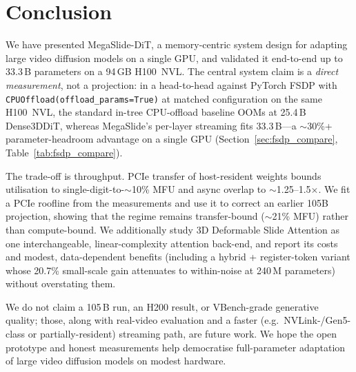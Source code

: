 \documentclass[11pt, letterpaper]{article}
\begin{document}
\section{Conclusion}
We have presented MegaSlide-DiT, a memory-centric system design for adapting large video diffusion models on a single GPU, and validated it end-to-end up to 33.3\,B parameters on a 94\,GB H100~NVL. The central system claim is a \emph{direct measurement}, not a projection: in a head-to-head against PyTorch FSDP with \texttt{CPUOffload(offload\_params=True)} at matched configuration on the same H100~NVL, the standard in-tree CPU-offload baseline OOMs at 25.4\,B Dense3DDiT, whereas MegaSlide's per-layer streaming fits 33.3\,B---a $\sim$30\%+ parameter-headroom advantage on a single GPU (Section~\ref{sec:fsdp_compare}, Table~\ref{tab:fsdp_compare}).

The trade-off is throughput. PCIe transfer of host-resident weights bounds utilisation to single-digit-to-$\sim$10\% MFU and async overlap to $\sim$1.25--1.5$\times$. We fit a PCIe roofline from the measurements and use it to correct an earlier 105B projection, showing that the regime remains transfer-bound ($\sim$21\% MFU) rather than compute-bound. We additionally study 3D Deformable Slide Attention as one interchangeable, linear-complexity attention back-end, and report its costs and modest, data-dependent benefits (including a hybrid + register-token variant whose 20.7\% small-scale gain attenuates to within-noise at 240\,M parameters) without overstating them.

We do not claim a 105\,B run, an H200 result, or VBench-grade generative quality; those, along with real-video evaluation and a faster (e.g.\ NVLink-/Gen5-class or partially-resident) streaming path, are future work. We hope the open prototype and honest measurements help democratise full-parameter adaptation of large video diffusion models on modest hardware.
\end{document}
